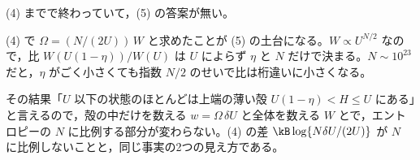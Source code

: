 \begin{kotaeran}
   (4) までで終わっていて，(5) の答案が無い。
\end{kotaeran}
\begin{rikai}
  \item (4) で $\Omega=(N/(2U))\,W$ と求めたことが (5) の土台になる。$W\propto U^{N/2}$ なので，比 $W(U(1-\eta))/W(U)$ は $U$ によらず $\eta$ と $N$ だけで決まる。$N\sim10^{23}$ だと，$\eta$ がごく小さくても指数 $N/2$ のせいで比は桁違いに小さくなる。
  \item その結果「$U$ 以下の状態のほとんどは上端の薄い殻 $U(1-\eta)<H\le U$ にある」と言えるので，殻の中だけを数える $w=\Omega\,\delta U$ と全体を数える $W$ とで，エントロピーの $N$ に比例する部分が変わらない。(4) の差 $\kB\log\{N\delta U/(2U)\}$ が $N$ に比例しないことと，同じ事実の2つの見え方である。
\end{rikai}
